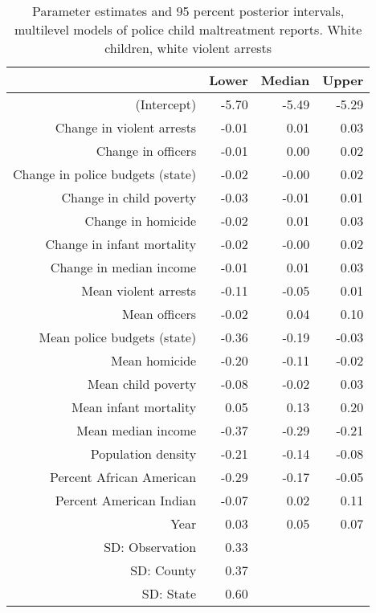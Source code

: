 \begin{table}[ht]
\centering
\begin{tabular}{rrrr}
  \hline
 & Lower & Median & Upper \\ 
  \hline
(Intercept) & -5.70 & -5.49 & -5.29 \\ 
  Change in violent arrests & -0.01 & 0.01 & 0.03 \\ 
  Change in officers & -0.01 & 0.00 & 0.02 \\ 
  Change in police budgets (state) & -0.02 & -0.00 & 0.02 \\ 
  Change in child poverty & -0.03 & -0.01 & 0.01 \\ 
  Change in homicide & -0.02 & 0.01 & 0.03 \\ 
  Change in infant mortality & -0.02 & -0.00 & 0.02 \\ 
  Change in median income & -0.01 & 0.01 & 0.03 \\ 
  Mean violent arrests & -0.11 & -0.05 & 0.01 \\ 
  Mean officers & -0.02 & 0.04 & 0.10 \\ 
  Mean police budgets (state) & -0.36 & -0.19 & -0.03 \\ 
  Mean homicide & -0.20 & -0.11 & -0.02 \\ 
  Mean child poverty & -0.08 & -0.02 & 0.03 \\ 
  Mean infant mortality & 0.05 & 0.13 & 0.20 \\ 
  Mean median income & -0.37 & -0.29 & -0.21 \\ 
  Population density & -0.21 & -0.14 & -0.08 \\ 
  Percent African American & -0.29 & -0.17 & -0.05 \\ 
  Percent American Indian & -0.07 & 0.02 & 0.11 \\ 
  Year & 0.03 & 0.05 & 0.07 \\ 
  SD: Observation & 0.33 &  &  \\ 
  SD: County & 0.37 &  &  \\ 
  SD: State & 0.60 &  &  \\ 
   \hline
\end{tabular}
\caption{Parameter estimates and 95 percent posterior intervals, multilevel models of 
             police child maltreatment reports. White children, white violent arrests} 
\end{table}
